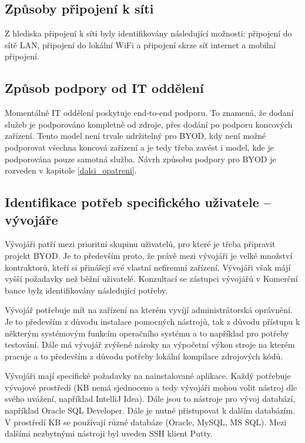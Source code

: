 \subsection{Způsoby připojení k síti}
Z hlediska připojení k síti byly identifikovány následující možnosti: připojení do sítě LAN, připojení do lokální WiFi a připojení skrze síť internet a mobilní připojení.

\subsection{Způsob podpory od IT oddělení}
Momentálně IT oddělení poskytuje end-to-end podporu. To znamená, že dodaní služeb je podporováno kompletně od zdroje, přes dodání po podporu koncových zařízení. Tento model není trvale udržitelný pro BYOD, kdy není možné podporovat všechna koncová zařízení a je tedy třeba zavést i model, kde je podporována pouze samotná služba. Návrh způsobu podpory pro BYOD je rozveden v kapitole \ref{dalsi_opatreni}.

\subsection{Identifikace potřeb specifického uživatele -- vývojáře}\label{potreby_vyvojar}
Vývojáři patří mezi prioritní skupinu uživatelů, pro které je třeba připravit projekt BYOD. Je to především proto, že právě mezi vývojáři je velké množství kontraktorů, kteří si přinášejí své vlastní nefiremní zařízení. Vývojáři však májí vyšší požadavky než běžní uživatelé. Konzultací se zástupci vývojářů v Komerční bance bylz identifikovány následující potřeby. 

Vývojář potřebuje mít na zařízení na kterém vyvíjí administrátorská oprávnění. Je to především z důvodu instalace pomocných nástrojů, tak z důvodu přístupu k některým systémovým funkcím operačního systému a to například pro potřeby testování. Dále má vývojář zvýšené nároky na výpočetní výkon stroje na kterém pracuje a to především z důvodu potřeby lokální kompilace zdrojových kódů. 

Vývojáři mají specifické požadavky na nainstalované aplikace. Každý potřebuje vývojové prostředí (KB nemá sjednoceno a tedy vývojáři mohou volit nástroj dle svého uvážení, například IntelliJ Idea). Dále jsou to nástroje pro vývoj databází, například Oracle SQL Developer. Dále je nutné přistupovat k dalším databázím. V prostředí KB se používají různé databáze (Oracle, MySQL, MS SQL). Mezi dalšími nezbytnými nástroji byl uveden SSH klient Putty.

